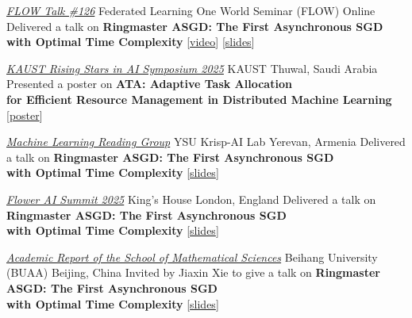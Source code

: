 \documentclass[10pt,a4paper,sans]{moderncv}        %
\newcommand{\red}{\color{cherry}}
\newcommand{\kaust}{KAUST}
\newcommand{\yerevan}{Yerevan, Armenia}
\newcommand{\thuwal}{Thuwal, Saudi Arabia}
\newcommand{\highlight}[1]{{\red #1}}
\begin{document}
    {\textcolor{accent}{\href{https://sites.google.com/view/one-world-seminar-series-flow/archive/2025?authuser=0\#h.99nho9x1b8ju}{\textit{FLOW Talk \#126}}}}
    {Federated Learning One World Seminar (FLOW)}
    {Online}{}
    {
      Delivered a talk on \textbf{Ringmaster ASGD: The First Asynchronous SGD\\
      with Optimal Time Complexity} [{\textcolor{orange}{\href{https://youtu.be/DJI1SWfG6ME?si=VJGtD1G840gO5d-w}{video}}}] [{\href{https://artomaranjyan.github.io/assets/pdf/Ringmaster_FLOW.pdf}{slides}}]
    }

    {\textcolor{accent}{\href{https://www.kaust.edu.sa/en/news/rising-stars-in-ai-symposium-2025}{\textit{KAUST Rising Stars in AI Symposium 2025}}}}
    {\kaust}
    {\thuwal}
    {}
    {
      Presented a poster on \textbf{ATA: Adaptive Task Allocation\\ 
      for Efficient Resource Management in Distributed Machine Learning} [{\href{https://artomaranjyan.github.io/assets/pdf/ATA_Rising_Stars.pdf}{poster}}]
    }

    {\textcolor{accent}{\href{https://artomaranjyan.github.io/assets/pdf/YerevaNN_talk_announcment.jpg}{\textit{Machine Learning Reading Group}}}}
    {YSU Krisp-AI Lab}
    {\yerevan}
    {}
    {
      Delivered a talk on \textbf{Ringmaster ASGD: The First Asynchronous SGD\\
      with Optimal Time Complexity} [{\href{https://artomaranjyan.github.io/assets/pdf/Ringmaster_YerevaNN.pdf}{slides}}]
    }

    {\textcolor{accent}{\href{https://flower.ai/events/flower-ai-summit-2025/\#:\~:text=CTO\%20\%C2\%B7-,Ringmaster\%20ASGD\%3A\%20The\%20First\%20Asynchronous\%20SGD\%20with\%20Optimal\%20Time\%20Complexity,-Artavazd\%20Maranjyan}{\textit{Flower AI Summit 2025}}}}
    {King's House}
    {London, England}
    {}
    {
      Delivered a talk on \textbf{Ringmaster ASGD: The First Asynchronous SGD\\
      with Optimal Time Complexity} [{\href{https://artomaranjyan.github.io/assets/pdf/Ringmaster_Flower.pdf}{slides}}]
    }

    {\textcolor{accent}{\href{https://math.buaa.edu.cn/info/1296/6437.htm}{\textit{Academic Report of the School of Mathematical Sciences}}}}
    {Beihang University (BUAA)}
    {Beijing, China}
    {}
    {
      Invited by \highlight{Jiaxin Xie} to give a talk on \textbf{Ringmaster ASGD: The First Asynchronous SGD\\
      with Optimal Time Complexity} [{\href{https://artomaranjyan.github.io/assets/pdf/Ringmaster_BUAA.pdf}{slides}}]
    }
\end{document}
